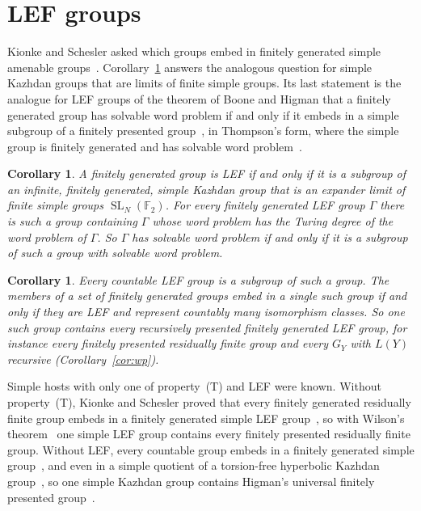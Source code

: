 \documentclass[11pt]{amsart}
\newtheorem{corollary}[theorem]{Corollary}
\newcommand{\F}{\mathbb F}
\newcommand{\SL}{\operatorname{SL}}
\begin{document}
\section{LEF groups}\label{sec:lef}

Kionke and Schesler asked which groups embed in finitely generated simple
amenable groups~\cite{KionkeSchesler}. Corollary~\ref{cor:lef} answers the
analogous question for simple Kazhdan groups that are limits of finite
simple groups. Its last statement is the analogue for LEF groups of the
theorem of Boone and Higman that a finitely generated group has solvable
word problem if and only if it embeds in a simple subgroup of a finitely
presented group~\cite{BooneHigman}, in Thompson's form, where the simple
group is finitely generated and has solvable word problem~\cite{Thompson80}.

\begin{corollary}\label{cor:lef}
A finitely generated group is LEF if and only if it is a subgroup of an
infinite, finitely generated, simple Kazhdan group that is an expander
limit of finite simple groups $\SL_N(\F_2)$. For every finitely generated
LEF group $\Gamma$ there is such a group containing $\Gamma$ whose word
problem has the Turing degree of the word problem of $\Gamma$. So $\Gamma$
has solvable word problem if and only if it is a subgroup of such a group
with solvable word problem.
\end{corollary}

\begin{corollary}\label{cor:host}
Every countable LEF group is a subgroup of such a group. The members of a
set of finitely generated groups embed in a single such group if and only
if they are LEF and represent countably many isomorphism classes. So one
such group contains every recursively presented finitely generated LEF
group, for instance every finitely presented residually finite group and
every $G_Y$ with $L(Y)$ recursive (Corollary~\ref{cor:wp}).
\end{corollary}

Simple hosts with only one of property~\textup{(T)} and LEF were known.
Without property~\textup{(T)}, Kionke and Schesler proved that every
finitely generated residually finite group embeds in a finitely generated
simple LEF group~\cite[Theorem~1.2]{KionkeSchesler}, so with Wilson's
theorem~\cite{Wilson} one simple LEF group contains every finitely
presented residually finite group. Without LEF, every countable group
embeds in a finitely generated simple group~\cite{Gorjuskin,Schupp}, and
even in a simple quotient of a torsion-free hyperbolic Kazhdan
group~\cite[Theorem~1.5]{CoulonFournierFacio}, so one simple Kazhdan group
contains Higman's universal finitely presented group~\cite{Higman}.
\end{document}
